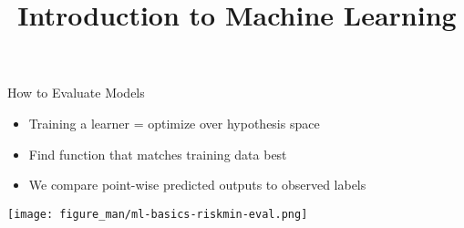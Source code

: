 \documentclass[11pt,compress,t,notes=noshow, xcolor=table]{beamer}
\title{Introduction to Machine Learning}
\begin{document}


\begin{vbframe}{How to Evaluate Models}

\begin{itemize}
\item Training a learner = optimize over hypothesis space
\item Find function that matches training data best
\item We compare point-wise predicted outputs to 
observed labels
\end{itemize}

\lz




\begin{center}\texttt{[image: figure\_man/ml-basics-riskmin-eval.png]} \end{center}

  
\end{vbframe}
\end{document}

